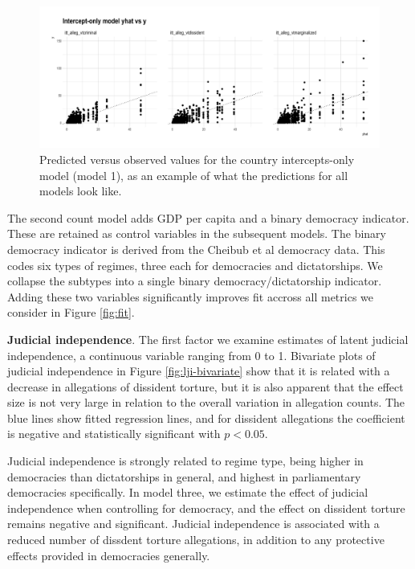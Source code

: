 \documentclass[12pt]{article}
\begin{document}
\begin{figure}
\begin{center}
\caption{Predicted versus observed values for the country intercepts-only model (model 1), as an example of what the predictions for all models look like.}
\includegraphics[width=.99\textwidth]{../output/mdl1-y-vs-yhat.png}
\end{center}
\end{figure}

The second count model adds GDP per capita and a binary democracy indicator. These are retained as control variables in the subsequent models. The binary democracy indicator is derived from the Cheibub et al democracy data. This codes six types of regimes, three each for democracies and dictatorships. We collapse the subtypes into a single binary democracy/dictatorship indicator. Adding these two variables significantly improves fit accross all metrics we consider in Figure \ref{fig:fit}.

\textbf{Judicial independence}. The first factor we examine estimates of latent judicial independence, a continuous variable ranging from 0 to 1. Bivariate plots of judicial independence in Figure \ref{fig:lji-bivariate} show that it is related with a decrease in allegations of dissident torture, but it is also apparent that the effect size is not very large in relation to the overall variation in allegation counts. The blue lines show fitted regression lines, and for dissident allegations the coefficient is negative and statistically significant with $p<0.05$. 

Judicial independence is strongly related to regime type, being higher in democracies than dictatorships in general, and highest in parliamentary democracies specifically. In model three, we estimate the effect of judicial independence when controlling for democracy, and the effect on dissident torture remains negative and significant. Judicial independence is associated with a reduced number of dissdent torture allegations, in addition to any protective effects provided in democracies generally. 
\end{document}
